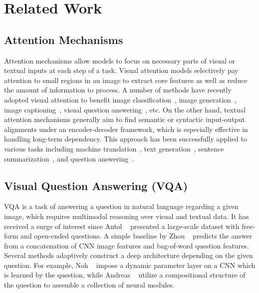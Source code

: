 \documentclass[10pt,twocolumn,letterpaper]{article}
\begin{document}
\section{Related Work}
\subsection{Attention Mechanisms}
Attention mechanisms allow models to focus on necessary parts of visual or textual inputs at each step of a task.
Visual attention models selectively pay attention to small regions in an image to extract core features as well as reduce the amount of information to process.
A number of methods have recently adopted visual attention to benefit image classification~\cite{mnih2014recurrent,stollenga2014deep}, image generation~\cite{gregor2015draw}, image captioning~\cite{xu2015show}, visual question answering~\cite{yang2016stacked,shih2016where,xiong2016dynamic}, etc.
On the other hand, textual attention mechanisms generally aim to find semantic or syntactic input-output alignments under an encoder-decoder framework, which is especially effective in handling long-term dependency.
This approach has been successfully applied to various tasks including machine translation~\cite{bahdanau2015neural}, text generation~\cite{li2015hierarchical}, sentence summarization~\cite{rush2015neural}, and question answering~\cite{kumar2016ask,xiong2016dynamic}.

\subsection{Visual Question Answering (VQA)}
VQA is a task of answering a question in natural language regarding a given image, which requires multimodal reasoning over visual and textual data.
It has received a surge of interest since Antol \etal~\cite{antol2015vqa} presented a large-scale dataset with free-form and open-ended questions.
A simple baseline by Zhou \etal~\cite{zhou2015simple} predicts the answer from a concatenation of CNN image features and bag-of-word question features.
Several methods adaptively construct a deep architecture depending on the given question. 
For example, Noh \etal~\cite{noh2016image} impose a dynamic parameter layer on a CNN which is learned by the question, while Andreas \etal~\cite{andreas2016neural} utilize a compositional structure of the question to assemble a collection of neural modules.
\end{document}

